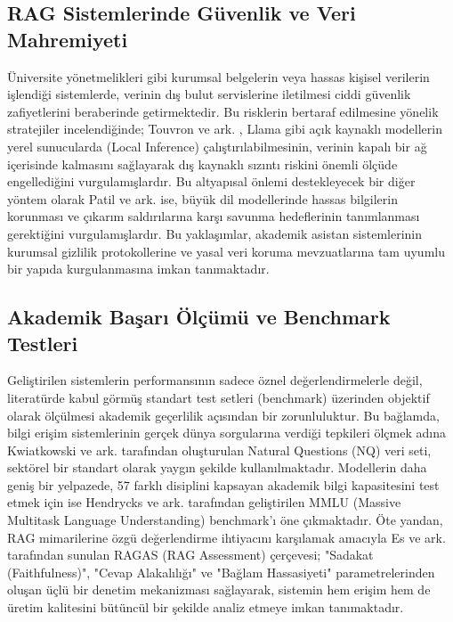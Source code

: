 \documentclass[12pt,a4paper]{report}
\begin{document}
\subsection{RAG Sistemlerinde Güvenlik ve Veri Mahremiyeti}
Üniversite yönetmelikleri gibi kurumsal belgelerin veya hassas kişisel verilerin işlendiği sistemlerde, verinin dış bulut servislerine iletilmesi ciddi güvenlik zafiyetlerini beraberinde getirmektedir. Bu risklerin bertaraf edilmesine yönelik stratejiler incelendiğinde; Touvron ve ark. \cite{touvron2023llama}, Llama gibi açık kaynaklı modellerin yerel sunucularda (Local Inference) çalıştırılabilmesinin, verinin kapalı bir ağ içerisinde kalmasını sağlayarak dış kaynaklı sızıntı riskini önemli ölçüde engellediğini vurgulamışlardır. Bu altyapısal önlemi destekleyecek bir diğer yöntem olarak Patil ve ark. \cite{patil2023pii} ise, büyük dil modellerinde hassas bilgilerin korunması ve çıkarım saldırılarına karşı savunma hedeflerinin tanımlanması gerektiğini vurgulamışlardır. Bu yaklaşımlar, akademik asistan sistemlerinin kurumsal gizlilik protokollerine ve yasal veri koruma mevzuatlarına tam uyumlu bir yapıda kurgulanmasına imkan tanımaktadır.

\subsection{Akademik Başarı Ölçümü ve Benchmark Testleri}
Geliştirilen sistemlerin performansının sadece öznel değerlendirmelerle değil, literatürde kabul görmüş standart test setleri (benchmark) üzerinden objektif olarak ölçülmesi akademik geçerlilik açısından bir zorunluluktur. Bu bağlamda, bilgi erişim sistemlerinin gerçek dünya sorgularına verdiği tepkileri ölçmek adına Kwiatkowski ve ark. \cite{kwiatkowski2019natural} tarafından oluşturulan Natural Questions (NQ) veri seti, sektörel bir standart olarak yaygın şekilde kullanılmaktadır. Modellerin daha geniş bir yelpazede, 57 farklı disiplini kapsayan akademik bilgi kapasitesini test etmek için ise Hendrycks ve ark. \cite{hendrycks2021measuring} tarafından geliştirilen MMLU (Massive Multitask Language Understanding) benchmark'ı öne çıkmaktadır. Öte yandan, RAG mimarilerine özgü değerlendirme ihtiyacını karşılamak amacıyla Es ve ark. \cite{es2023ragas} tarafından sunulan RAGAS (RAG Assessment) çerçevesi; "Sadakat (Faithfulness)", "Cevap Alakalılığı" ve "Bağlam Hassasiyeti" parametrelerinden oluşan üçlü bir denetim mekanizması sağlayarak, sistemin hem erişim hem de üretim kalitesini bütüncül bir şekilde analiz etmeye imkan tanımaktadır.
\end{document}
